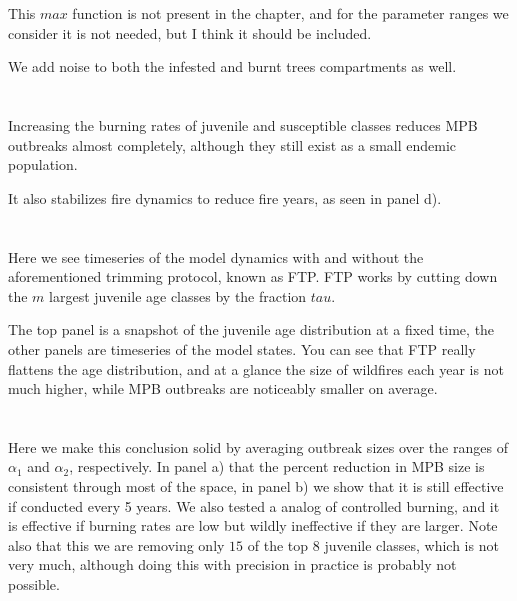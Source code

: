 \documentclass{article}
\begin{document}
This $max$ function is not present in the chapter, and for the parameter ranges we consider it is not needed, but I think it should be included.

We add noise to both the infested and burnt trees compartments as well.


\section{}

Increasing the burning rates of juvenile and susceptible classes reduces MPB outbreaks almost completely, although they still exist as a small endemic population.

It also stabilizes fire dynamics to reduce fire years, as seen in panel d).

\section{}

Here we see timeseries of the model dynamics with and without the aforementioned trimming protocol, known as FTP. FTP works by cutting down the $m$ largest juvenile age classes by the fraction $tau$.

The top panel is a snapshot of the juvenile age distribution at a fixed time, the other panels are timeseries of the model states. You can see that FTP really flattens the age distribution, and at a glance the size of wildfires each year is not much higher, while MPB outbreaks are noticeably smaller on average.  


\section{}

Here we make this conclusion solid by averaging outbreak sizes over the ranges of $\alpha_1$ and $\alpha_2$, respectively. In panel a) that the percent reduction in MPB size is consistent through most of the space, in panel b) we show that it is still effective if conducted every 5 years. We also tested a analog of controlled burning, and it is effective if burning rates are low but wildly ineffective if they are larger. Note also that this we are removing only $15$ of the top 8 juvenile classes, which is not very much, although doing this with precision in practice is probably not possible. 

\section{}
\end{document}
